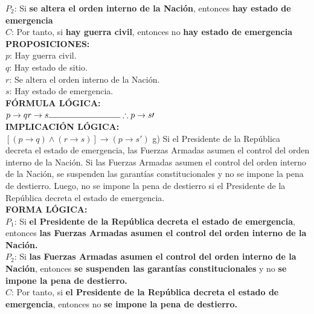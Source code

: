 \documentclass[letterpaper,12pt]{article}
\begin{document}
\begin{sloppypar}
$P_2$: Si \textcolor[rgb]{0.2,0.7,0.5}{\textbf{se altera el orden interno de la Nación}}, entonces \textcolor[rgb]{0.5,0.2,0.7}{\textbf{hay estado de emergencia}} \\ 
$C$: Por tanto, si \textcolor[rgb]{1,0,0}{\textbf{hay guerra civil}}, entonces no \textcolor[rgb]{0.5,0.2,0.7}{\textbf{hay estado de emergencia}}
\vspace{0.3cm}\\ 
\textbf{PROPOSICIONES:} \\ 
$p$: Hay guerra civil. \\ 
$q$: Hay estado de sitio. \\ 
$r$: Se altera el orden interno de la Nación. \\ 
$s$: Hay estado de emergencia.
\vspace{0.3cm}\\ 
\textbf{FÓRMULA LÓGICA:} \\
$p \rightarrow q \\ r \rightarrow s \\ \noindent\rule{3cm}{0.4pt} \\ \therefore p \rightarrow s\prime$ 
\vspace{0.3cm}\\ 
\textbf{IMPLICACIÓN LÓGICA:} \\
$[(p \rightarrow q)\wedge(r \rightarrow s)] \rightarrow (p \rightarrow s\prime)$
\newpage
g) Si el Presidente de la República decreta el estado de emergencia, las Fuerzas Armadas asumen el control del
orden interno de la Nación. Si las Fuerzas Armadas asumen el control del orden interno de la Nación, se
suspenden las garantías constitucionales y no se impone la pena de destierro. Luego, no se impone la pena
de destierro si el Presidente de la República decreta el estado de emergencia.
\vspace{0.3cm}\\ 
\textbf{FORMA LÓGICA:} \\
$P_1$: Si \textcolor[rgb]{1,0,0}{\textbf{el Presidente de la República decreta el estado de emergencia}}, entonces \textcolor[rgb]{0.2,0.5,0.7}{\textbf{las Fuerzas Armadas asumen el control del orden interno de la Nación.}} \\ 
$P_2$: Si \textcolor[rgb]{0.2,0.5,0.7}{\textbf{las Fuerzas Armadas asumen el control del orden interno de la Nación}}, entonces \textcolor[rgb]{0.2,0.7,0.5}{\textbf{se suspenden las garantías constitucionales}} y no \textcolor[rgb]{0.5,0.2,0.7}{\textbf{se impone la pena de destierro.}} \\ 
$C$: Por tanto, si \textcolor[rgb]{1,0,0}{\textbf{el Presidente de la República decreta el estado de emergencia}}, entonces no \textcolor[rgb]{0.5,0.2,0.7}{\textbf{se impone la pena de destierro.}}

\end{sloppypar}
\end{document}
